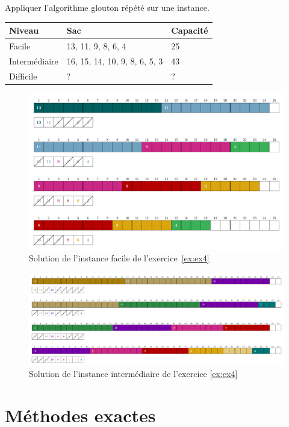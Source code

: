 \documentclass[11pt]{article}
\begin{document}
   \begin{exercice}{}
    \label{ex:ex4}
    Appliquer l'algorithme glouton répété sur une instance.\\
    \begin{tabular}{lll}
      \toprule
      Niveau & Sac & Capacité \\
      \midrule
      Facile & 13, 11, 9, 8, 6, 4 & 25 \\
      Intermédiaire & 16, 15, 14, 10, 9, 8, 6, 5, 3 & 43 \\
      Difficile & ? & ? \\
      \bottomrule
      \end{tabular}
  \end{exercice}

 \begin{figure}[htbp]
    \centering
    \includegraphics[width=0.6\linewidth]{ex3-6-MTGS.pdf}
    \caption{Solution de l'instance facile de l'exercice~\ref{ex:ex4}}
  \end{figure}

  \begin{figure}[htbp]
    \centering
    \includegraphics[width=0.6\linewidth]{ex3-9-MTGS.pdf}
    \caption{Solution de l'instance intermédiaire de l'exercice \ref{ex:ex4}}
  \end{figure}


  \section{Méthodes exactes}


\end{document}

